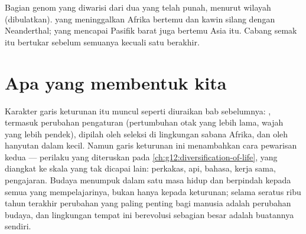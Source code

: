\begin{omfigure}

{\small Bagian genom yang diwarisi dari dua  yang telah punah,
menurut wilayah (dibulatkan).  yang meninggalkan Afrika
bertemu dan kawin silang dengan Neanderthal;  yang mencapai
Pasifik barat juga bertemu  Asia itu. Cabang semak itu
bertukar  sebelum semuanya kecuali satu berakhir.}
\end{omfigure}

\section{Apa yang membentuk kita}

\begin{proposition}\label{prop:g12:human-evolution:culture}
Karakter garis keturunan itu muncul seperti diuraikan bab sebelumnya:
, termasuk perubahan pengaturan  (pertumbuhan
otak yang lebih lama, wajah yang lebih pendek), dipilah oleh seleksi
di lingkungan sabana Afrika, dan oleh hanyutan dalam  kecil.
Namun garis keturunan ini menambahkan cara pewarisan kedua ---
perilaku yang diteruskan pada
\cref{ch:g12:diversification-of-life}, yang diangkat ke skala yang tak
dicapai  lain: perkakas, api, bahasa, kerja sama, pengajaran.
Budaya menumpuk dalam satu masa hidup dan berpindah kepada semua yang
mempelajarinya, bukan hanya kepada keturunan; selama seratus ribu
tahun terakhir perubahan yang paling penting bagi manusia adalah
perubahan budaya, dan lingkungan tempat  ini berevolusi
sebagian besar adalah buatannya sendiri.
\end{proposition}
\admitted

